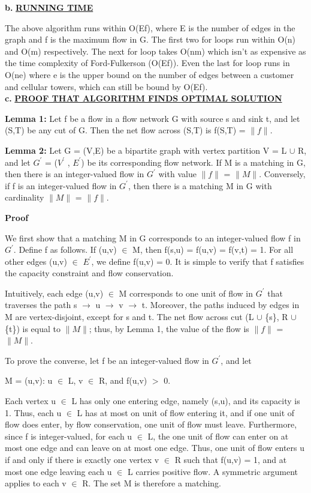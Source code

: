 \documentclass[11pt]{csc_assignment}
\begin{document}
\begin{description}
\textbf{b.} \underline{\textbf{RUNNING TIME}}

The above algorithm runs within O(Ef), where E is the number of edges in the graph and f is the maximum flow in G. The first two for loops run within O(n) and O(m) respectively. The next for loop takes O(nm) which isn't as expensive as the time complexity of Ford-Fulkerson (O(Ef)). Even the last for loop runs in O(ne) where e is the upper bound on the number of edges between a customer and cellular towers, which can still be bound by O(Ef). \\

\textbf{c.} \underline{\textbf{PROOF THAT ALGORITHM FINDS OPTIMAL SOLUTION}}

\textbf{Lemma 1:}
Let f be a flow in a flow network G with source s and sink t, and let (S,T) be any cut of G. Then the net flow across (S,T) is f(S,T) = $\|f\|$.

\textbf{Lemma 2:}
Let G = (V,E) be a bipartite graph with vertex partition V = L $\cup$ R, and let $G^{'}$ = ($V^{'}$ , $E^{'}$) be its corresponding flow network. If M is a matching in G, then there is an integer-valued flow in $G^{'}$ with value $\|f\|$ = $\|M\|$. Conversely, if f is an integer-valued flow in $G^{'}$, then there is a matching M in G with cardinality $\|M\|$ = $\|f\|$.

\textbf{Proof}

We first show that a matching M in G corresponds to an integer-valued flow f in $G^{'}$. Define f as follows. If (u,v) $\in$ M, then f(s,u) = f(u,v) = f(v,t) = 1. For all other edges (u,v) $\in$ $E^{'}$, we define f(u,v) = 0. It is simple to verify that f satisfies the capacity constraint and flow conservation.

Intuitively, each edge (u,v) $\in$ M corresponds to one unit of flow in $G^{'}$ that traverses the path s $\rightarrow$ u $\rightarrow$ v $\rightarrow$ t. Moreover, the paths induced by edges in M are vertex-disjoint, except for s and t. The net flow across cut (L $\cup$ \{s\}, R $\cup$ \{t\}) is equal to $\|M\|$; thus, by Lemma 1, the value of the flow is $\|f\|$ = $\|M\|$.

To prove the converse, let f be an integer-valued flow in $G^{'}$, and let

M = {(u,v): u $\in$ L, v $\in$ R, and f(u,v) $>$ 0}.

Each vertex u $\in$ L has only one entering edge, namely (s,u), and its capacity is 1. Thus, each u $\in$ L has at most on unit of flow entering it, and if one unit of flow does enter, by flow conservation, one unit of flow must leave. Furthermore, since f is integer-valued, for each u $\in$ L, the one unit of flow can enter on at most one edge and can leave on at most one edge. Thus, one unit of flow enters u if and only if there is exactly one vertex v $\in$ R such that f(u,v) = 1, and at most one edge leaving each u $\in$ L carries positive flow. A symmetric argument applies to each v $\in$ R. The set M is therefore a matching.


\end{description}
\end{document}
